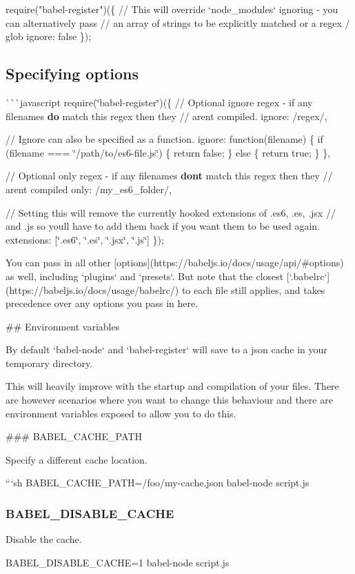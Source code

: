 \begin{DoxyCode}
require("babel-register")(\{
  // This will override `node\_modules` ignoring - you can alternatively pass
  // an array of strings to be explicitly matched or a regex / glob
  ignore: false
\});
\end{DoxyCode}


\subsection*{Specifying options}

\`{}\`{}\`{}javascript require(\char`\"{}babel-\/register\char`\"{})(\{ // Optional ignore regex -\/ if any filenames {\bfseries do} match this regex then they // aren\textquotesingle{}t compiled. ignore\+: /regex/,

// Ignore can also be specified as a function. ignore\+: function(filename) \{ if (filename === \char`\"{}/path/to/es6-\/file.\+js\char`\"{}) \{ return false; \} else \{ return true; \} \},

// Optional only regex -\/ if any filenames {\bfseries don\textquotesingle{}t} match this regex then they // aren\textquotesingle{}t compiled only\+: /my\+\_\+es6\+\_\+folder/,

// Setting this will remove the currently hooked extensions of .es6, {\ttfamily .es}, {\ttfamily .jsx} // and .js so you\textquotesingle{}ll have to add them back if you want them to be used again. extensions\+: \mbox{[}\char`\"{}.\+es6\char`\"{}, \char`\"{}.\+es\char`\"{}, \char`\"{}.\+jsx\char`\"{}, \char`\"{}.\+js\char`\"{}\mbox{]} \}); 
\begin{DoxyCode}
You can pass in all other [options](https://babeljs.io/docs/usage/api/#options) as well,
including `plugins` and `presets`. But note that the closest
       [`.babelrc`](https://babeljs.io/docs/usage/babelrc/)
to each file still applies, and takes precedence over any options you pass in here.

## Environment variables

By default `babel-node` and `babel-register` will save to a json cache in your
temporary directory.

This will heavily improve with the startup and compilation of your files. There
are however scenarios where you want to change this behaviour and there are
environment variables exposed to allow you to do this.

### BABEL\_CACHE\_PATH

Specify a different cache location.

```sh
BABEL\_CACHE\_PATH=/foo/my-cache.json babel-node script.js
\end{DoxyCode}


\subsubsection*{B\+A\+B\+E\+L\+\_\+\+D\+I\+S\+A\+B\+L\+E\+\_\+\+C\+A\+C\+HE}

Disable the cache.


\begin{DoxyCode}
BABEL\_DISABLE\_CACHE=1 babel-node script.js
\end{DoxyCode}
 